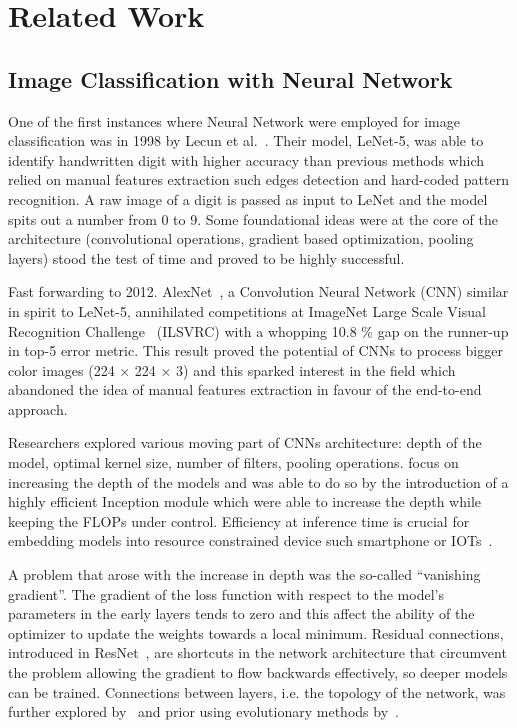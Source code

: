 \chapter{Related Work}
\label{ch:related-work}

\section{Image Classification with Neural Network}
\label{sec:image-classification-with-neural-network}

One of the first instances where Neural Network were employed for image
classification was in 1998 by Lecun et al.~\cite{GradientBasedLecun1998}. Their
model, LeNet-5, was able to identify handwritten digit with higher accuracy
than previous methods which relied on manual features extraction such edges
detection and hard-coded pattern recognition. A raw image of a digit is passed
as input to LeNet and the model spits out a number from 0 to 9. Some
foundational ideas were at the core of the architecture (convolutional
operations, gradient based optimization, pooling layers) stood the test of time
and proved to be highly successful.

Fast forwarding to 2012. AlexNet~\cite{ImagenetClassiKrizhe2017}, a Convolution
Neural Network (CNN) similar in spirit to LeNet-5, annihilated competitions at
ImageNet Large Scale Visual Recognition Challenge~\cite{ImagenetALarDeng2009}
(ILSVRC) with a whopping 10.8 \% gap on the runner-up in top-5 error metric.
This result proved the potential of CNNs to process bigger color images (224 ×
224 × 3) and this sparked interest in the field which abandoned the idea of
manual features extraction in favour of the end-to-end approach.

Researchers explored various moving part of CNNs architecture: depth of the
model, optimal kernel size, number of filters, pooling operations.
\cite{VeryDeepConvoSimony2014,GoingDeeperWiSzeged2014} focus on increasing the
depth of the models and \cite{GoingDeeperWiSzeged2014} was able to do so by the
introduction of a highly efficient Inception module which were able to increase
the depth while keeping the FLOPs under control. Efficiency at inference time is
crucial for embedding models into resource constrained device such smartphone or
IOTs~\cite{SqueezenetAleIandol2016, MnasnetPlatfoTanM2018,
MobilenetsEffHoward2017}.

A problem that arose with the increase in depth was the so-called ``vanishing
gradient''. The gradient of the loss function with respect to the model's
parameters in the early layers tends to zero and this affect the ability of the
optimizer to update the weights towards a local minimum. Residual connections,
introduced in ResNet~\cite{DeepResidualLHeKa2015, IdentityMappinHeKa2016}, are
shortcuts in the network architecture that circumvent the problem allowing the
gradient to flow backwards effectively, so deeper models can be trained.
Connections between layers, i.e. the topology of the network, was further
explored by~\cite{DualPathNetwoChen2017, DenselyConnectHuang2016} and prior
using evolutionary methods by~\cite{DesigningNeuraMiller1989,
EvolvingNeuralStanle2002}.

